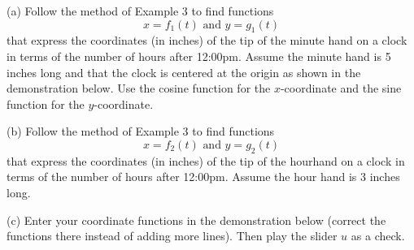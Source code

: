 \documentclass{ximera}
\begin{document}
\begin{question} \label{Qgpnd0:Motion}
(a) Follow the method of Example 3 to find functions
\[
   x = f_1(t) \text{ and } y=g_1(t)
\]
that express the coordinates (in inches) of the tip of the minute hand on a clock in terms of the number of hours after 12:00pm. Assume the minute hand is 5 inches long and that the clock is centered at the origin as shown in the demonstration below. Use the cosine function for the $x$-coordinate and the sine function for the $y$-coordinate.

(b) Follow the method of Example 3 to find functions
\[
   x = f_2(t) \text{ and } y=g_2(t)
\]
that express the coordinates (in inches) of the tip of the hourhand on a clock in terms of the number of hours after 12:00pm. Assume the hour hand is 3 inches long.

(c) Enter your coordinate functions in the demonstration below (correct the functions there instead of adding more lines). Then play the slider $u$ as a check.


 
\begin{onlineOnly}
    \begin{center}
\end{center}
\end{onlineOnly}


\end{question}
\end{document}
